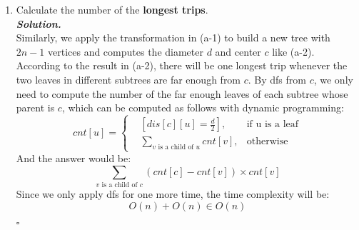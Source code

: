 \documentclass[12pt, a4paper, UTF8]{article}
\newenvironment{solution}[1][\it{Solution}]{\textbf{#1. }\\}{\begin{flushright}$\square$\end{flushright}}
\begin{document}
\begin{enumerate}
\begin{solution}
                Also, it's trivial that $s, t$ are in different subtrees. Thus, for any leaf $p$ such that $dis[c][p] = \frac{d}{2}$ (won't satisfy if it's not a leaf), $p$ will be either in different subtree from either $s$ or $t$. So $p$ will be one of the endpoints of some longest trip.\\
                For the time complexity because $2n - 1 \in O(n)$ and we have done dfs once and bfs three times, we have:
                $$4 \times O(n) \in O(n)$$
            \end{solution}
        \item Calculate the number of the \textbf{longest trips}.\\
            \begin{solution}
                Similarly, we apply the transformation in (a-1) to build a new tree with $2n - 1$ vertices and computes the diameter $d$ and center $c$ like (a-2).\\
                According to the result in (a-2), there will be one longest trip whenever the two leaves in different subtrees are far enough from $c$. By dfs from $c$, we only need to compute the number of the far enough leaves of each subtree whose parent is $c$, which can be computed as follows with dynamic programming:
                $$cnt[u] = \left\{\begin{split}
                    &[dis[c][u] = \frac{d}{2}],& \text{if u is a leaf}\\
                    &\sum_{v \text{ is a child of } u} cnt[v],& \text{otherwise}
                \end{split}\right.$$
                And the answer would be: 
                $$\sum_{v \text{ is a child of } c} (cnt[c] - cnt[v]) \times cnt[v]$$
                Since we only apply dfs for one more time, the time complexity will be:
                    $$O(n) + O(n) \in O(n)$$
            \end{solution}
    \end{enumerate}
\end{document}
